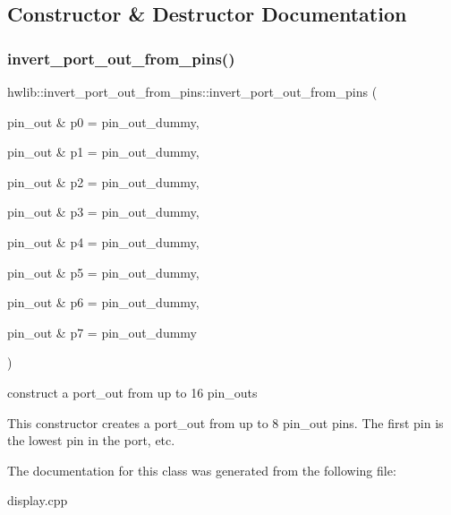 \subsection{Constructor \& Destructor Documentation}
\mbox{\label{classhwlib_1_1invert__port__out__from__pins_a2eae53fe915f8e09ab5d66594d79ef29}} 
\subsubsection{\texorpdfstring{invert\+\_\+port\+\_\+out\+\_\+from\+\_\+pins()}{invert\_port\_out\_from\_pins()}}
{\footnotesize\ttfamily hwlib\+::invert\+\_\+port\+\_\+out\+\_\+from\+\_\+pins\+::invert\+\_\+port\+\_\+out\+\_\+from\+\_\+pins (\begin{DoxyParamCaption}\item[{pin\+\_\+out \&}]{p0 = {\ttfamily pin\+\_\+out\+\_\+dummy},  }\item[{pin\+\_\+out \&}]{p1 = {\ttfamily pin\+\_\+out\+\_\+dummy},  }\item[{pin\+\_\+out \&}]{p2 = {\ttfamily pin\+\_\+out\+\_\+dummy},  }\item[{pin\+\_\+out \&}]{p3 = {\ttfamily pin\+\_\+out\+\_\+dummy},  }\item[{pin\+\_\+out \&}]{p4 = {\ttfamily pin\+\_\+out\+\_\+dummy},  }\item[{pin\+\_\+out \&}]{p5 = {\ttfamily pin\+\_\+out\+\_\+dummy},  }\item[{pin\+\_\+out \&}]{p6 = {\ttfamily pin\+\_\+out\+\_\+dummy},  }\item[{pin\+\_\+out \&}]{p7 = {\ttfamily pin\+\_\+out\+\_\+dummy} }\end{DoxyParamCaption})\hspace{0.3cm}{\ttfamily [inline]}}



construct a port\+\_\+out from up to 16 pin\+\_\+outs 

This constructor creates a port\+\_\+out from up to 8 pin\+\_\+out pins. The first pin is the lowest pin in the port, etc. 

The documentation for this class was generated from the following file\+:\begin{DoxyCompactItemize}
\item 
display.\+cpp\end{DoxyCompactItemize}
